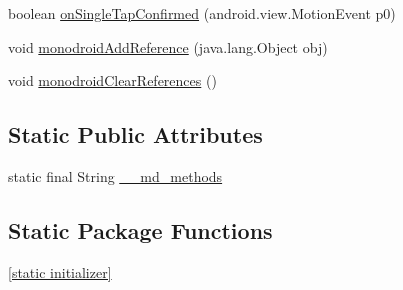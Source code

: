 \begin{CompactItemize}
\item 
boolean \hyperlink{classmd5b60ffeb829f638581ab2bb9b1a7f4f3f_1_1_inner_gesture_listener_c3640ab4d9f56cd4ca4bb118d64abaa4}{onSingleTapConfirmed} (android.view.MotionEvent p0)
\item 
void \hyperlink{classmd5b60ffeb829f638581ab2bb9b1a7f4f3f_1_1_inner_gesture_listener_f9a7e9fe86c58734ef4cf954524214b5}{monodroidAddReference} (java.lang.Object obj)
\item 
void \hyperlink{classmd5b60ffeb829f638581ab2bb9b1a7f4f3f_1_1_inner_gesture_listener_e61db418045e7b1ed0459d348db52672}{monodroidClearReferences} ()
\end{CompactItemize}
\subsection*{Static Public Attributes}
\begin{CompactItemize}
\item 
static final String \hyperlink{classmd5b60ffeb829f638581ab2bb9b1a7f4f3f_1_1_inner_gesture_listener_e6fdb0c574b25527e6407117dcb68256}{\_\-\_\-md\_\-methods}
\end{CompactItemize}
\subsection*{Static Package Functions}
\begin{CompactItemize}
\item 
\hyperlink{classmd5b60ffeb829f638581ab2bb9b1a7f4f3f_1_1_inner_gesture_listener_b09db747dbc5db1c2d4b02082342f731}{\mbox{[}static initializer\mbox{]}}
\end{CompactItemize}
